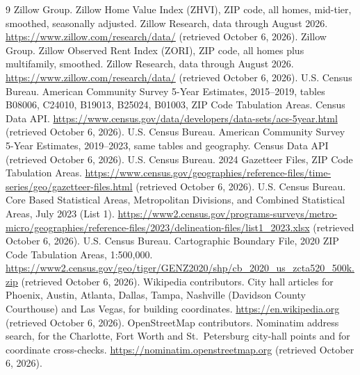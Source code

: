 \documentclass[11pt]{article}
\begin{document}
\begin{thebibliography}{9}\setlength{\itemsep}{0pt}
 Zillow Group. Zillow Home Value Index (ZHVI), ZIP code, all homes, mid-tier, smoothed, seasonally adjusted. Zillow
Research, data through August 2026. \url{https://www.zillow.com/research/data/} (retrieved October 6, 2026).
 Zillow Group. Zillow Observed Rent Index (ZORI), ZIP code, all homes plus multifamily, smoothed. Zillow Research,
data through August 2026. \url{https://www.zillow.com/research/data/} (retrieved October 6, 2026).
 U.S. Census Bureau. American Community Survey 5-Year Estimates, 2015--2019, tables B08006, C24010, B19013, B25024,
B01003, ZIP Code Tabulation Areas. Census Data API. \url{https://www.census.gov/data/developers/data-sets/acs-5year.html}
(retrieved October 6, 2026).
 U.S. Census Bureau. American Community Survey 5-Year Estimates, 2019--2023, same tables and geography. Census Data
API (retrieved October 6, 2026).
 U.S. Census Bureau. 2024 Gazetteer Files, ZIP Code Tabulation Areas.
\url{https://www.census.gov/geographies/reference-files/time-series/geo/gazetteer-files.html} (retrieved October 6, 2026).
 U.S. Census Bureau. Core Based Statistical Areas, Metropolitan Divisions, and Combined Statistical Areas, July 2023
(List 1).
\url{https://www2.census.gov/programs-surveys/metro-micro/geographies/reference-files/2023/delineation-files/list1_2023.xlsx}
(retrieved October 6, 2026).
 U.S. Census Bureau. Cartographic Boundary File, 2020 ZIP Code Tabulation Areas, 1:500,000.
\url{https://www2.census.gov/geo/tiger/GENZ2020/shp/cb_2020_us_zcta520_500k.zip} (retrieved October 6, 2026).
 Wikipedia contributors. City hall articles for Phoenix, Austin, Atlanta, Dallas, Tampa, Nashville (Davidson County
Courthouse) and Las Vegas, for building coordinates. \url{https://en.wikipedia.org} (retrieved October 6, 2026).
 OpenStreetMap contributors. Nominatim address search, for the Charlotte, Fort Worth and St.\ Petersburg city-hall
points and for coordinate cross-checks. \url{https://nominatim.openstreetmap.org} (retrieved October 6, 2026).
\end{thebibliography}
\end{document}
